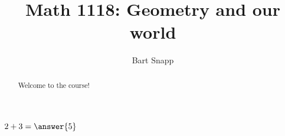 \documentclass{ximera}
\title{Math 1118: Geometry and our world}
\author{Bart Snapp}
\begin{document}
\begin{abstract}
Welcome to the course!
\end{abstract}
\maketitle


\begin{exercise}
    $2+3=\answer{5}$
\end{exercise}
\end{document}
